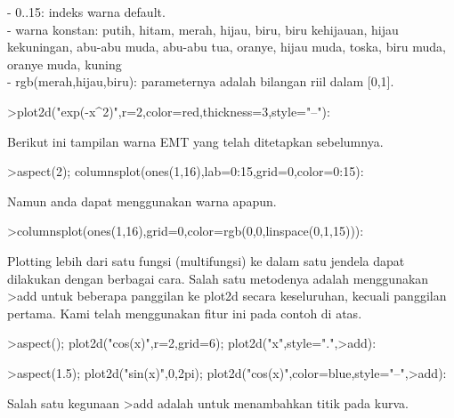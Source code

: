 \documentclass[a4paper,10pt]{article}
\begin{document}
\begin{eulernotebook}
\begin{eulercomment}
\begin{eulercomment}
\begin{eulercomment}
\begin{eulercomment}
\begin{eulercomment}
\begin{eulercomment}
\begin{eulercomment}
\begin{eulercomment}
\begin{eulercomment}
\begin{eulercomment}
\begin{eulercomment}
- 0..15: indeks warna default.\\
- warna konstan: putih, hitam, merah, hijau, biru, biru kehijauan,
hijau kekuningan, abu-abu muda, abu-abu tua, oranye, hijau muda,
toska, biru muda, oranye muda, kuning \\
- rgb(merah,hijau,biru): parameternya adalah bilangan riil dalam
[0,1].
\end{eulercomment}
\begin{eulerprompt}
>plot2d("exp(-x^2)",r=2,color=red,thickness=3,style="--"):
\end{eulerprompt}
\begin{eulercomment}
Berikut ini tampilan warna EMT yang telah ditetapkan sebelumnya.
\end{eulercomment}
\begin{eulerprompt}
>aspect(2); columnsplot(ones(1,16),lab=0:15,grid=0,color=0:15):
\end{eulerprompt}
\begin{eulercomment}
Namun anda dapat menggunakan warna apapun.
\end{eulercomment}
\begin{eulerprompt}
>columnsplot(ones(1,16),grid=0,color=rgb(0,0,linspace(0,1,15))):
\end{eulerprompt}
\begin{eulercomment}
Plotting lebih dari satu fungsi (multifungsi) ke dalam satu jendela
dapat dilakukan dengan berbagai cara. Salah satu metodenya adalah
menggunakan \textgreater{}add untuk beberapa panggilan ke plot2d secara
keseluruhan, kecuali panggilan pertama. Kami telah  menggunakan fitur
ini pada contoh di atas.
\end{eulercomment}
\begin{eulerprompt}
>aspect(); plot2d("cos(x)",r=2,grid=6); plot2d("x",style=".",>add):
\end{eulerprompt}
\begin{eulerprompt}
>aspect(1.5); plot2d("sin(x)",0,2pi); plot2d("cos(x)",color=blue,style="--",>add):
\end{eulerprompt}
\begin{eulercomment}
Salah satu kegunaan \textgreater{}add adalah untuk menambahkan titik pada kurva.

\end{eulercomment}
\end{eulercomment}
\end{eulercomment}
\end{eulercomment}
\end{eulercomment}
\end{eulercomment}
\end{eulercomment}
\end{eulercomment}
\end{eulercomment}
\end{eulercomment}
\end{eulercomment}
\end{eulernotebook}
\end{document}
